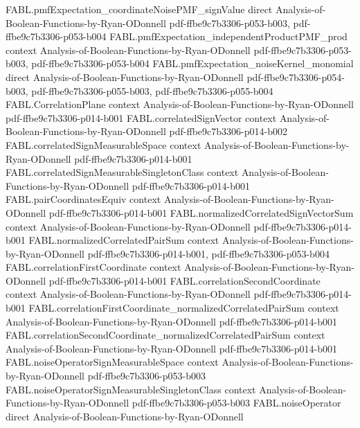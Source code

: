 \begin{theorem}
\proofstep
  {FABL.pmfExpectation_coordinateNoisePMF_signValue}
  {direct}
  {Analysis-of-Boolean-Functions-by-Ryan-ODonnell}
  {pdf-ffbe9c7b3306-p053-b003,
    pdf-ffbe9c7b3306-p053-b004}
\proofstep
  {FABL.pmfExpectation_independentProductPMF_prod}
  {context}
  {Analysis-of-Boolean-Functions-by-Ryan-ODonnell}
  {pdf-ffbe9c7b3306-p053-b003,
    pdf-ffbe9c7b3306-p053-b004}
\proofstep
  {FABL.pmfExpectation_noiseKernel_monomial}
  {direct}
  {Analysis-of-Boolean-Functions-by-Ryan-ODonnell}
  {pdf-ffbe9c7b3306-p054-b003,
    pdf-ffbe9c7b3306-p055-b003,
    pdf-ffbe9c7b3306-p055-b004}
\proofstep
  {FABL.CorrelationPlane}
  {context}
  {Analysis-of-Boolean-Functions-by-Ryan-ODonnell}
  {pdf-ffbe9c7b3306-p014-b001}
\proofstep
  {FABL.correlatedSignVector}
  {context}
  {Analysis-of-Boolean-Functions-by-Ryan-ODonnell}
  {pdf-ffbe9c7b3306-p014-b002}
\proofstep
  {FABL.correlatedSignMeasurableSpace}
  {context}
  {Analysis-of-Boolean-Functions-by-Ryan-ODonnell}
  {pdf-ffbe9c7b3306-p014-b001}
\proofstep
  {FABL.correlatedSignMeasurableSingletonClass}
  {context}
  {Analysis-of-Boolean-Functions-by-Ryan-ODonnell}
  {pdf-ffbe9c7b3306-p014-b001}
\proofstep
  {FABL.pairCoordinatesEquiv}
  {context}
  {Analysis-of-Boolean-Functions-by-Ryan-ODonnell}
  {pdf-ffbe9c7b3306-p014-b001}
\proofstep
  {FABL.normalizedCorrelatedSignVectorSum}
  {context}
  {Analysis-of-Boolean-Functions-by-Ryan-ODonnell}
  {pdf-ffbe9c7b3306-p014-b001}
\proofstep
  {FABL.normalizedCorrelatedPairSum}
  {context}
  {Analysis-of-Boolean-Functions-by-Ryan-ODonnell}
  {pdf-ffbe9c7b3306-p014-b001,
    pdf-ffbe9c7b3306-p053-b004}
\proofstep
  {FABL.correlationFirstCoordinate}
  {context}
  {Analysis-of-Boolean-Functions-by-Ryan-ODonnell}
  {pdf-ffbe9c7b3306-p014-b001}
\proofstep
  {FABL.correlationSecondCoordinate}
  {context}
  {Analysis-of-Boolean-Functions-by-Ryan-ODonnell}
  {pdf-ffbe9c7b3306-p014-b001}
\proofstep
  {FABL.correlationFirstCoordinate_normalizedCorrelatedPairSum}
  {context}
  {Analysis-of-Boolean-Functions-by-Ryan-ODonnell}
  {pdf-ffbe9c7b3306-p014-b001}
\proofstep
  {FABL.correlationSecondCoordinate_normalizedCorrelatedPairSum}
  {context}
  {Analysis-of-Boolean-Functions-by-Ryan-ODonnell}
  {pdf-ffbe9c7b3306-p014-b001}
\proofstep
  {FABL.noiseOperatorSignMeasurableSpace}
  {context}
  {Analysis-of-Boolean-Functions-by-Ryan-ODonnell}
  {pdf-ffbe9c7b3306-p053-b003}
\proofstep
  {FABL.noiseOperatorSignMeasurableSingletonClass}
  {context}
  {Analysis-of-Boolean-Functions-by-Ryan-ODonnell}
  {pdf-ffbe9c7b3306-p053-b003}
\proofstep
  {FABL.noiseOperator}
  {direct}
  {Analysis-of-Boolean-Functions-by-Ryan-ODonnell}

\end{theorem}
